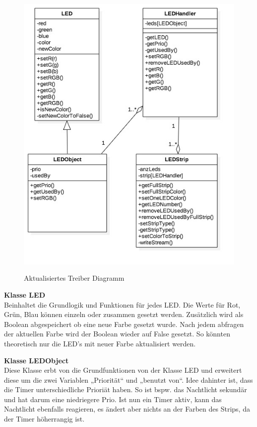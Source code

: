 \documentclass[]{article}
\begin{document}
\begin{figure}[H]
\centering
\includegraphics{./WI61_Treiber_Diagramm.jpeg}\\
\caption{Aktualisiertes Treiber Diagramm}
\end{figure}

\textbf{Klasse LED}\\
Beinhaltet die Grundlogik und Funktionen für jedes LED. Die Werte für
Rot, Grün, Blau können einzeln oder zusammen gesetzt werden. Zusätzlich
wird als Boolean abgespeichert ob eine neue Farbe gesetzt wurde. Nach
jedem abfragen der aktuellen Farbe wird der Boolean wieder auf False
gesetzt. So könnten theoretisch nur die LED's mit neuer Farbe
aktualisiert werden.

\textbf{Klasse LEDObject}\\
Diese Klasse erbt von die Grundfunktionen von der Klasse LED und
erweitert diese um die zwei Variablen „Priorität`` und „benutzt von``.
Idee dahinter ist, dass die Timer unterschiedliche Prioriät haben. So
ist bspw. das Nachtlicht sekundär und hat darum eine niedriegere Prio.
Ist nun ein Timer aktiv, kann das Nachtlicht ebenfalls reagieren, es
ändert aber nichts an der Farben des Strips, da der Timer höherrangig
ist.
\end{document}
